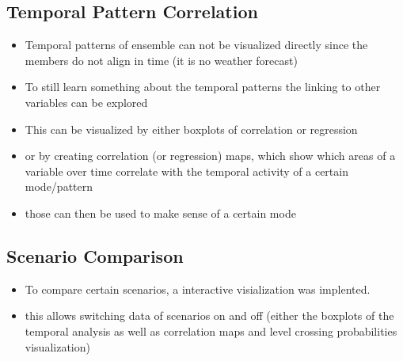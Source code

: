 \subsection{Temporal Pattern Correlation} %
\label{sec:Temporal Pattern Correlation}

\begin{itemize}
  \item Temporal patterns of ensemble can not be visualized directly since the members do not align in time (it is no weather forecast)
  \item To still learn something about the temporal patterns the linking to other variables can be explored 
  \item This can be visualized by either boxplots of correlation or regression
  \item or by creating correlation (or regression) maps, which show which areas of a variable over time correlate with the temporal activity of a certain mode/pattern 
  \item those can then be used to make sense of a certain mode 
\end{itemize}

\subsection{Scenario Comparison} %
\label{sec:Scenario Comparison}

\begin{itemize}
  \item To compare certain scenarios, a interactive visialization was implented. 
  \item this allows switching data of scenarios on and off (either the boxplots of the temporal analysis as well as correlation maps and level crossing probabilities visualization)
\end{itemize}

